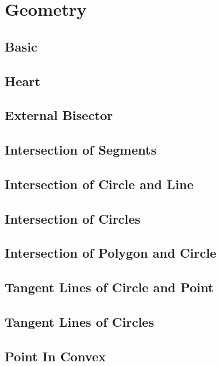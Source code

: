 \section{Geometry}
\subsection{Basic}

\subsection{Heart}

\subsection{External Bisector}

\subsection{Intersection of Segments}

\subsection{Intersection of Circle and Line}

\subsection{Intersection of Circles}

\subsection{Intersection of Polygon and Circle}

\subsection{Tangent Lines of Circle and Point}

\subsection{Tangent Lines of Circles}

\subsection{Point In Convex}
